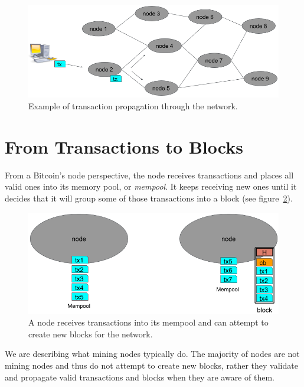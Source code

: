 \begin{figure}[h]
\begin{center}
\includegraphics[scale=0.5]{images/transaction-propagation}
\caption{Example of transaction propagation through the network.}
\label{fig:transaction-propagation}
\end{center}
\end{figure}


\section{From Transactions to Blocks}
From a Bitcoin's node perspective, the node receives transactions and places all valid ones into its memory pool, or \emph{mempool}. It keeps receiving new ones until it decides that it will group some of those transactions into a block (see figure~\ref{fig:node-perspective}).

\begin{figure}[h]
\begin{center}
\includegraphics[scale=0.5]{images/node-perspective}
\caption{A node receives transactions into its mempool and can attempt to create new blocks for the network.}
\label{fig:node-perspective}
\end{center}
\end{figure}

\begin{note}
We are describing what mining nodes typically do. The majority of nodes are not mining nodes and thus do not attempt to create new blocks, rather they validate and propagate valid transactions and blocks when they are aware of them.
\end{note}

